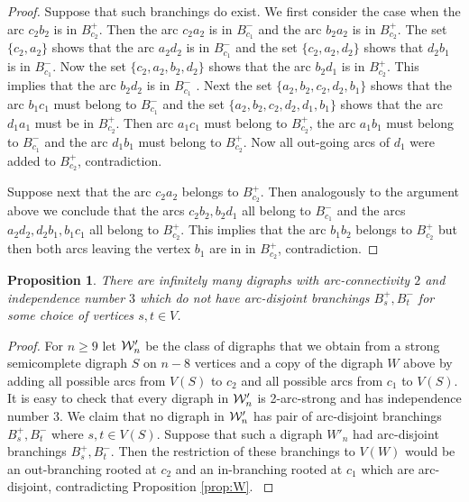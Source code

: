 \documentclass{article}
\newtheorem{proposition}[theorem]{Proposition}
\theoremstyle{definition}
\newcommand{\jbj}[1]{{#1}}
\newcommand{\2}{\vspace{0.2cm}}
\begin{document}
\begin{proof}
  Suppose that such branchings do exist.  We first consider the case
  when the arc $c_2b_2$ is in $B_{c_2}^+$. Then the arc $c_2a_2$ is in
  $B_{c_1}^-$ and the arc $b_2a_2$ is in $B_{c_2}^+$. The set
  $\{c_2,a_2\}$ shows that the arc $a_2d_2$ is in $B_{c_1}^-$ and the
  set $\{c_2,a_2,d_2\}$ shows that $d_2b_1$ is in $B_{c_1}^-$. Now the
  set $\{c_2,a_2,b_2,d_2\}$ shows that the arc $b_2d_1$ is in
  $B_{c_2}^+$. This implies that the arc $b_2d_2$ is in $B_{c_1}^-$ .
  Next the set $\{a_2,b_2,c_2,d_2,b_1\}$ shows that the arc $b_1c_1$
  must belong to $B_{c_1}^-$ and the set $\{a_2,b_2,c_2,d_2,d_1,b_1\}$
  shows that the arc $d_1a_1$ must be in $B_{c_2}^+$. Then arc
  $a_1c_1$ must belong to $B_{c_2}^+ $, the arc $a_1b_1$ must belong
  to $B_{c_1}^-$ and the arc $d_1b_1$ must belong to $B_{c_2}^+$. Now
  all out-going arcs of $d_1$ were added to $B_{c_2}^+$,
  contradiction.

  Suppose next that the arc $c_2a_2$ belongs to $B_{c_2}^+$. Then
  analogously to the argument above we conclude that the arcs
  $c_2b_2,b_2d_1$ all belong to $B_{c_1}^-$ and the arcs
  $a_2d_2,d_2b_1,b_1c_1$ all belong to $B_{c_2}^+$. This implies that
  the arc $b_1b_2$ belongs to $B_{c_2}^+$ but then both arcs leaving
  the vertex $b_1$ are in in $B_{c_2}^+$, contradiction.
  \end{proof}

  
  
  

  \begin{proposition}\label{prop:infalpha3}
    There are infinitely many digraphs with arc-connectivity $2$ and
    independence number $3$ which do not have arc-disjoint branchings
    $B_s^+,B_t^-$ for some choice of vertices $s,t\in V$.
  \end{proposition}

  \begin{proof}
\jbj{For $n\geq 9$ let ${\cal W}'_n$  be the class of digraphs that we obtain from a strong semicomplete digraph $S$ on $n-8$ vertices and a copy of the digraph $W$ above by adding all possible arcs from $V(S)$ to $c_2$ and all possible arcs from $c_1$ to $V(S)$. It is easy to check that every digraph in ${\cal W}'_n$ is 2-arc-strong and has independence number 3. We claim that no digraph in ${\cal W}'_n$ has pair of arc-disjoint branchings $B^+_s,B^-_t$ where $s,t\in V(S)$. Suppose that such a digraph $W'_n$ had arc-disjoint branchings $B^+_s,B^-_t$. Then the restriction of these branchings to $V(W)$ would be an out-branching rooted at $c_2$ and an in-branching rooted at $c_1$ which are arc-disjoint, contradicting Proposition \ref{prop:W}.
    }
  \end{proof}
\end{document}
